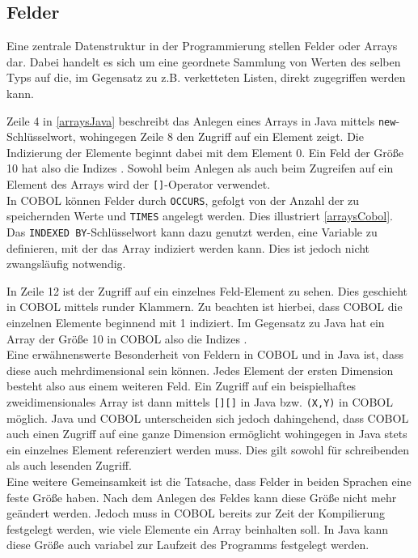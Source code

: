 \subsection{Felder}\label{sec:felder}
Eine zentrale Datenstruktur in der Programmierung stellen Felder oder Arrays dar. Dabei handelt es sich um eine geordnete Sammlung von Werten des selben Typs auf die, im Gegensatz zu z.B. verketteten Listen, direkt zugegriffen werden kann.\\


Zeile 4 in \autoref{arraysJava} beschreibt das Anlegen eines Arrays in Java mittels \texttt{new}-Schlüsselwort, wohingegen Zeile 8 den Zugriff auf ein Element zeigt. Die Indizierung der Elemente beginnt dabei mit dem Element 0. Ein Feld der Größe 10 hat also die Indizes . Sowohl beim Anlegen als auch beim Zugreifen auf ein Element des Arrays wird der \texttt{[]}-Operator verwendet.\\

In COBOL können Felder durch \texttt{OCCURS}, gefolgt von der Anzahl der zu speichernden Werte und \texttt{TIMES} angelegt werden. Dies illustriert \autoref{arraysCobol}. Das \texttt{INDEXED BY}-Schlüsselwort kann dazu genutzt werden, eine Variable zu definieren, mit der das Array indiziert werden kann. Dies ist jedoch nicht zwangsläufig notwendig.\\


In Zeile 12 ist der Zugriff auf ein einzelnes Feld-Element zu sehen. Dies geschieht in COBOL mittels runder Klammern. Zu beachten ist hierbei, dass COBOL die einzelnen Elemente beginnend mit 1 indiziert. Im Gegensatz zu Java hat ein Array der Größe 10 in COBOL also die Indizes .\\

Eine erwähnenswerte Besonderheit von Feldern in COBOL und in Java ist, dass diese auch mehrdimensional sein können. Jedes Element der ersten Dimension besteht also aus einem weiteren Feld. Ein Zugriff auf ein beispielhaftes zweidimensionales Array ist dann mittels \texttt{[][]} in Java bzw. \texttt{(X,Y)} in COBOL möglich. Java und COBOL unterscheiden sich jedoch dahingehend, dass COBOL auch einen Zugriff auf eine ganze Dimension ermöglicht wohingegen in Java stets ein einzelnes Element referenziert werden muss. Dies gilt sowohl für schreibenden als auch lesenden Zugriff.\\

Eine weitere Gemeinsamkeit ist die Tatsache, dass Felder in beiden Sprachen eine feste Größe haben. Nach dem Anlegen des Feldes kann diese Größe nicht mehr geändert werden. Jedoch muss in COBOL bereits zur Zeit der Kompilierung festgelegt werden, wie viele Elemente ein Array beinhalten soll. In Java kann diese Größe auch variabel zur Laufzeit des Programms festgelegt werden.\\